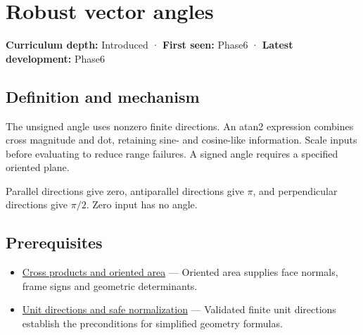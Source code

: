 \hypertarget{appendix-e569e60e18e6}{}\label{referencestart:appendix-e569e60e18e6}
\section{Robust vector angles}\label{appendix-e569e60e18e6-robust-vector-angles}

\hypertarget{appendix-e569e60e18e6-robust-vector-angles}{}

\textbf{Curriculum depth:} Introduced · \textbf{First seen:} Phase6 · \textbf{Latest development:} Phase6

\begin{allmightroledefinition}

\subsection{Definition and mechanism}\label{appendix-e569e60e18e6-definition-and-mechanism}

\hypertarget{appendix-e569e60e18e6-definition-and-mechanism}{}

The unsigned angle uses nonzero finite directions. An atan2 expression combines cross magnitude and dot, retaining sine- and cosine-like information. Scale inputs before evaluating to reduce range failures. A signed angle requires a specified oriented plane.

\end{allmightroledefinition}

Parallel directions give zero, antiparallel directions give \(\pi\), and perpendicular directions give \(\pi/2\). Zero input has no angle.

\subsection{Prerequisites}\label{appendix-e569e60e18e6-prerequisites}

\hypertarget{appendix-e569e60e18e6-prerequisites}{}

\begin{itemize}
\tightlist
\item
  \hyperref[appendix-2391db8052b1]{Cross products and oriented area} --- Oriented area supplies face normals, frame signs and geometric determinants.
\item
  \hyperref[appendix-f744e41b95b4]{Unit directions and safe normalization} --- Validated finite unit directions establish the preconditions for simplified geometry formulas.
\end{itemize}

